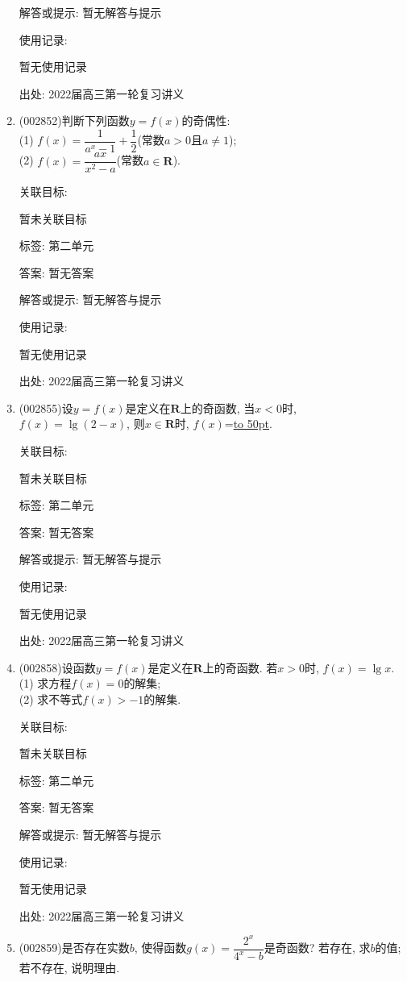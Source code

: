 \documentclass[10pt,a4paper]{article}
\newcommand{\blank}[1]{\underline{\hbox to #1pt{}}}
\begin{document}
\begin{enumerate}[1.]
解答或提示: 暂无解答与提示

使用记录:

暂无使用记录


出处: 2022届高三第一轮复习讲义
\item { (002852)}判断下列函数$y=f(x)$的奇偶性:\\
(1) $f(x)=\dfrac 1{a^x-1}+\dfrac 12$(常数$a>0$且$a\ne 1$);\\
(2) $f(x)=\dfrac{ax}{x^2-a}$(常数$a\in \mathbf{R}$).


关联目标:

暂未关联目标



标签: 第二单元

答案: 暂无答案

解答或提示: 暂无解答与提示

使用记录:

暂无使用记录


出处: 2022届高三第一轮复习讲义
\item { (002855)}设$y=f(x)$是定义在$\mathbf{R}$上的奇函数, 当$x<0$时, $f(x)=\lg(2-x)$, 则$x\in \mathbf{R}$时, $f(x)$=\blank{50}.


关联目标:

暂未关联目标



标签: 第二单元

答案: 暂无答案

解答或提示: 暂无解答与提示

使用记录:

暂无使用记录


出处: 2022届高三第一轮复习讲义
\item { (002858)}设函数$y=f(x)$是定义在$\mathbf{R}$上的奇函数. 若$x>0$时, $f(x)=\lg x$.\\
(1) 求方程$f(x)=0$的解集;\\
(2) 求不等式$f(x)>-1$的解集.


关联目标:

暂未关联目标



标签: 第二单元

答案: 暂无答案

解答或提示: 暂无解答与提示

使用记录:

暂无使用记录


出处: 2022届高三第一轮复习讲义
\item { (002859)}是否存在实数$b$, 使得函数$g(x)=\dfrac{2^x}{{4^x}-b}$是奇函数? 若存在, 求$b$的值; 若不存在, 说明理由.



\end{enumerate}
\end{document}
